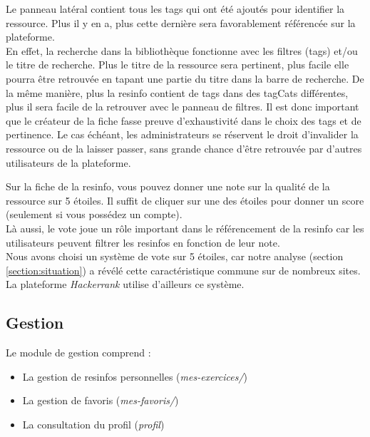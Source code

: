 
Le panneau latéral contient tous les \glspl{tag} qui ont été ajoutés pour identifier la ressource. Plus il y en a, plus cette dernière sera favorablement référencée sur la plateforme.\\

En effet, la recherche dans la bibliothèque fonctionne avec les filtres (\glspl{tag}) et/ou le titre de recherche. Plus le titre de la ressource sera pertinent, plus facile elle pourra être retrouvée en tapant une partie du titre dans la barre de recherche. 
De la même manière, plus la \gls{resinfo} contient de \glspl{tag} dans des \glspl{tagCat} différentes, plus il sera facile de la retrouver avec le panneau de filtres. Il est donc important que le créateur de la \gls{fiche} fasse preuve d'exhaustivité dans le choix des \glspl{tag} et de pertinence. Le cas échéant, les administrateurs se réservent le droit d'invalider la ressource ou de la laisser passer, sans grande chance d'être retrouvée par d'autres utilisateurs de la plateforme.


Sur la \gls{fiche} de la \gls{resinfo}, vous pouvez donner une note sur la qualité de la ressource sur 5 étoiles. Il suffit de cliquer sur une des étoiles pour donner un score (seulement si vous possédez un compte).\\

Là aussi, le vote joue un rôle important dans le référencement de la \gls{resinfo} car les utilisateurs peuvent filtrer les \glspl{resinfo} en fonction de leur note.\\

Nous avons choisi un système de vote sur 5 étoiles, car notre analyse (section \ref{section:situation}) a révélé cette caractéristique commune sur de nombreux sites. La plateforme \textit{Hackerrank} utilise d'ailleurs ce système.


\subsection{Gestion}

Le module de gestion comprend :

\begin{itemize}
    \item La gestion de \glspl{resinfo} personnelles (\textit{mes-exercices/})
    \item La gestion de favoris (\textit{mes-favoris/})
    \item La consultation du profil (\textit{profil})
\end{itemize}

